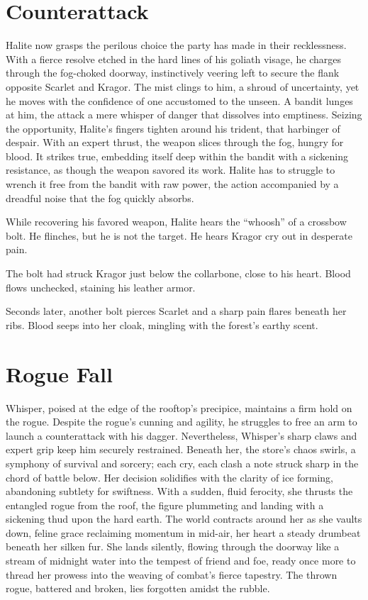 \documentclass[
  letterpaper,12pt,twoside,twocolumn,openany,
  nodeprecatedcode,bg=full]{dndbook}
\begin{document}
\section{Counterattack}\label{counterattack}

Halite now grasps the perilous choice the party has made in their
recklessness. With a fierce resolve etched in the hard lines of his
goliath visage, he charges through the fog-choked doorway, instinctively
veering left to secure the flank opposite Scarlet and Kragor. The mist
clings to him, a shroud of uncertainty, yet he moves with the confidence
of one accustomed to the unseen. A bandit lunges at him, the attack a
mere whisper of danger that dissolves into emptiness. Seizing the
opportunity, Halite's fingers tighten around his trident, that harbinger
of despair. With an expert thrust, the weapon slices through the fog,
hungry for blood. It strikes true, embedding itself deep within the
bandit with a sickening resistance, as though the weapon savored its
work. Halite has to struggle to wrench it free from the bandit with raw
power, the action accompanied by a dreadful noise that the fog quickly
absorbs.

While recovering his favored weapon, Halite hears the ``whoosh'' of a
crossbow bolt. He flinches, but he is not the target. He hears Kragor
cry out in desperate pain.

The bolt had struck Kragor just below the collarbone, close to his
heart. Blood flows unchecked, staining his leather armor.

Seconds later, another bolt pierces Scarlet and a sharp pain flares
beneath her ribs. Blood seeps into her cloak, mingling with the forest's
earthy scent.

\section{Rogue Fall}\label{rogue-fall}

Whisper, poised at the edge of the rooftop's precipice, maintains a firm
hold on the rogue. Despite the rogue's cunning and agility, he struggles
to free an arm to launch a counterattack with his dagger. Nevertheless,
Whisper's sharp claws and expert grip keep him securely restrained.
Beneath her, the store's chaos swirls, a symphony of survival and
sorcery; each cry, each clash a note struck sharp in the chord of battle
below. Her decision solidifies with the clarity of ice forming,
abandoning subtlety for swiftness. With a sudden, fluid ferocity, she
thrusts the entangled rogue from the roof, the figure plummeting and
landing with a sickening thud upon the hard earth. The world contracts
around her as she vaults down, feline grace reclaiming momentum in
mid-air, her heart a steady drumbeat beneath her silken fur. She lands
silently, flowing through the doorway like a stream of midnight water
into the tempest of friend and foe, ready once more to thread her
prowess into the weaving of combat's fierce tapestry. The thrown rogue,
battered and broken, lies forgotten amidst the rubble.
\end{document}
